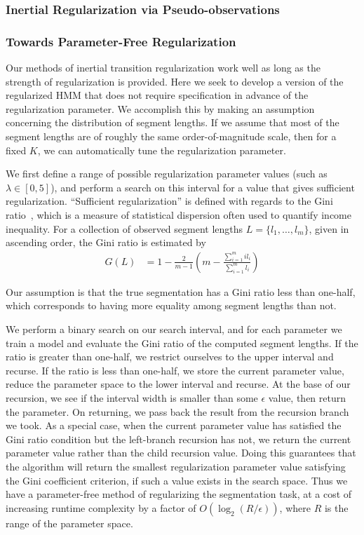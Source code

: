 \documentclass[12pt]{article}
\begin{document}
\subsubsection{Inertial Regularization via Pseudo-observations}



\subsubsection{Towards Parameter-Free Regularization}\label{sec:param-free}

Our methods of inertial transition regularization work well as long as the strength of regularization is provided. Here we seek to develop a version of the regularized HMM that does not require specification in advance of the regularization parameter. We accomplish this by making an assumption concerning the distribution of segment lengths. If we assume that most of the segment lengths are of roughly the same order-of-magnitude scale, then for a fixed $K$, we can automatically tune the regularization parameter.

We first define a range of possible regularization parameter values (such as $\lambda \in [0, 5]$), and perform a search on this interval for a value that gives sufficient regularization. ``Sufficient regularization'' is defined with regards to the Gini ratio~\cite{gini1936,wiki:1}, which is a measure of statistical dispersion often used to quantify income inequality. For a collection of observed segment lengths $L = \{l_1, \ldots, l_m\}$, given in ascending order, the Gini ratio is estimated by
\begin{align*}
    G(L) &= 1 - \frac{2}{m-1}\left(m - \frac{\sum_{i=1}^{m} i l_i}{\sum_{i=1}^{m} l_i}\right)
\end{align*}


Our assumption is that the true segmentation has a Gini ratio less than one-half, which corresponds to having more equality among segment lengths than not. 

We perform a binary search on our search interval, and for each parameter we train a model and evaluate the Gini ratio of the computed segment lengths. If the ratio is greater than one-half, we restrict ourselves to the upper interval and recurse. If the ratio is less than one-half, we store the current parameter value, reduce the parameter space to the lower interval and recurse. At the base of our recursion, we see if the interval width is smaller than some $\epsilon$ value, then return the parameter. On returning, we pass back the result from the recursion branch we took. As a special case, when the current parameter value has satisfied the Gini ratio condition but the left-branch recursion has not, we return the current parameter value rather than the child recursion value. Doing this guarantees that the algorithm will return the smallest regularization parameter value satisfying the Gini coefficient criterion, if such a value exists in the search space. Thus we have a parameter-free method of regularizing the segmentation task, at a cost of increasing runtime complexity by a factor of $O(\log_2 (R / \epsilon))$, where $R$ is the range of the parameter space.
\end{document}
